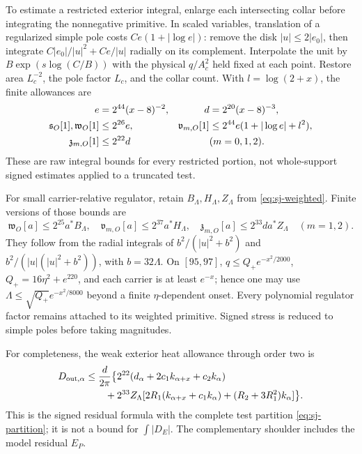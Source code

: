 To estimate a restricted exterior integral, enlarge each intersecting
collar before integrating the nonnegative primitive. In scaled variables,
translation of a regularized simple pole costs
$Ce(1+|\log e|)$: remove the disk $|u|\le2|e_0|$, then integrate
$C|e_0|/|u|^2+Ce/|u|$ radially on its complement. Interpolate the unit
by $B\exp(s\log(C/B))$ with the physical $q/A_c^2$ held fixed at
each point. Restore area $L_c^{-2}$, the pole factor $L_c$, and the
collar count. With $l=\log(2+x)$, the finite allowances are
\begin{align}
 e&=2^{44}(x-8)^{-2},&d&=2^{20}(x-8)^{-3},\notag\\
 \mathfrak s_O[1],\mathfrak w_O[1]&\le2^{26}e,&
 \mathfrak v_{m,O}[1]&\le2^{44}e(1+|\log e|+l^2),\notag\\
 \mathfrak z_{m,O}[1]&\le2^{22}d&& (m=0,1,2).
 \label{eq:ua-raw}
\end{align}
These are raw integral bounds for every restricted portion, not
whole-support signed estimates applied to a truncated test.

For small carrier-relative regulator, retain
$B_\Lambda,H_\Lambda,Z_\Lambda$ from \eqref{eq:sj-weighted}. Finite
versions of those bounds are
\begin{equation}
 \mathfrak w_O[a]\le2^{25}a^*B_\Lambda,\quad
 \mathfrak v_{m,O}[a]\le2^{37}a^*H_\Lambda,\quad
 \mathfrak z_{m,O}[a]\le2^{33}d a^*Z_\Lambda\quad(m=1,2).
 \label{eq:ua-weighted}
\end{equation}
They follow from the radial integrals of
$b^2/(|u|^2+b^2)$ and $b^2/(|u|(|u|^2+b^2))$, with $b=32\Lambda$.
On $[95,97]$, $q\le Q_+e^{-x^2/2000}$, $Q_+=16\eta^2+e^{220}$,
and each carrier is at least $e^{-x}$; hence one may use
$\Lambda\le\sqrt{Q_+}e^{-x^2/8000}$ beyond a finite
$\eta$-dependent onset. Every polynomial regulator factor remains
attached to its weighted primitive. Signed stress is reduced to simple
poles before taking magnitudes.

For completeness, the weak exterior heat allowance through order two is
\begin{align}
 D_{{\rm out},\alpha}\le\frac d{2\pi}\bigl\{
 &2^{22}(d_\alpha+2c_1k_{\alpha+x}+c_2k_\alpha)\notag\\
 {}+{}&2^{33}Z_\Lambda[2R_1(k_{\alpha+x}+c_1k_\alpha)
                  +(R_2+3R_1^2)k_\alpha]\bigr\}.
 \label{eq:ua-signed-heat}
\end{align}
This is the signed residual formula with the complete test partition
\eqref{eq:sj-partition}; it is not a bound for $\int|D_E|$.
The complementary shoulder includes the model residual $E_P$.


